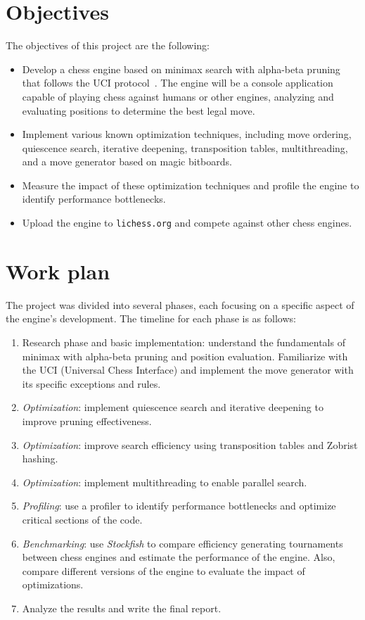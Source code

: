 \newpage

\section{Objectives}\label{sec:objectives}

\noindent The objectives of this project are the following:

\begin{itemize}[itemsep=1pt]
    \item Develop a chess engine based on minimax search with alpha-beta pruning that follows the UCI protocol~\cite{UciProtocol}. The engine will be a console application capable of playing chess against humans or other engines, analyzing and evaluating positions to determine the best legal move.
    \item Implement various known optimization techniques, including move ordering, quiescence search, iterative deepening, transposition tables, multithreading, and a move generator based on magic bitboards.
    \item Measure the impact of these optimization techniques and profile the engine to identify performance bottlenecks.
    \item Upload the engine to \texttt{lichess.org} and compete against other chess engines.
\end{itemize}

\section{Work plan}

The project was divided into several phases, each focusing on a specific aspect of the engine's development. The timeline for each phase is as follows:

\begin{enumerate}
    \item Research phase and basic implementation: understand the fundamentals of minimax with alpha-beta pruning and position evaluation. Familiarize with the UCI (Universal Chess Interface) and implement the move generator with its specific exceptions and rules.
    \item \textit{Optimization}: implement quiescence search and iterative deepening to improve pruning effectiveness.
    \item \textit{Optimization}: improve search efficiency using transposition tables and Zobrist hashing.
    \item \textit{Optimization}: implement multithreading to enable parallel search.
    \item \textit{Profiling}: use a profiler to identify performance bottlenecks and optimize critical sections of the code.
    \item \textit{Benchmarking}: use \textit{Stockfish} to compare efficiency generating tournaments between chess engines and estimate the performance of the engine. Also, compare different versions of the engine to evaluate the impact of optimizations.
    \item Analyze the results and write the final report.
\end{enumerate}

